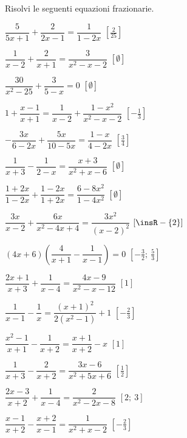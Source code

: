\begin{esercizio}[\Ast]
\label{ese:20.21}
Risolvi le seguenti equazioni frazionarie.
\begin{multicols}{2}
\begin{enumeratea}
 \item $\dfrac{5}{5x+1}+\dfrac{2}{2x-1}=\dfrac{1}{1-2x}$
  \hfill $\left[\frac{2}{25}\right]$
 \item $\dfrac{1}{x-2}+\dfrac{2}{x+1}=\dfrac{3}{x^{2}-x-2}$
  \hfill $\left[\emptyset\right]$
 \item $\dfrac{30}{x^{2}-25}+\dfrac{3}{5-x}=0$
  \hfill $\left[\emptyset\right]$
 \item $1+\dfrac{x-1}{x+1}=\dfrac{1}{x-2}+\dfrac{1-x^{2}}{x^{2}-x-2}$
  \hfill $\left[-{\frac{1}{3}}\right]$
 \item $-{\dfrac{3x}{6-2x}}+\dfrac{5x}{10-5x}=\dfrac{1-x}{4-2x}$
  \hfill $\left[\frac{3}{4}\right]$
 \item $\dfrac{1}{x+3}-\dfrac{1}{2-x}=\dfrac{x+3}{x^{2}+x-6}$
  \hfill $\left[\emptyset\right]$
 \item $\dfrac{1+2x}{1-2x}+\dfrac{1-2x}{1+2x}=\dfrac{6-8x^{2}}{1-4x^{2}}$
  \hfill $\left[\emptyset\right]$
 \item $\dfrac{3x}{x-2}+\dfrac{6x}{x^{2}-4x+4}=\dfrac{3x^{2}}{(x-2)^{2}}$
  \hfill $\left[\insR-\{2\}\right]$
 \item $(4x+6)\left(\dfrac{4}{x+1}-\dfrac{1}{x-1}\right)=0$
  \hfill $\left[-{\frac{3}{2}};~\frac{5}{3}\right]$
 \item $\dfrac{2x+1}{x+3}+\dfrac{1}{x-4}=\dfrac{4x-9}{x^{2}-x-12}$
  \hfill $\left[1\right]$
 \item $\dfrac{1}{x-1}-\dfrac{1}{x}=\dfrac{(x+1)^{2}}{2(x^{2}-1)}+1$
  \hfill $\left[-{\frac{2}{3}}\right]$
 \item $\dfrac{x^{2}-1}{x+1}-\dfrac{1}{x+2}=\dfrac{x+1}{x+2}-x$
  \hfill $\left[1\right]$
 \item $\dfrac{1}{x+3}-\dfrac{2}{x+2}=\dfrac{3x-6}{x^{2}+5x+6}$
  \hfill $\left[\frac{1}{2}\right]$
 \item $\dfrac{2x-3}{x+2}+\dfrac{1}{x-4}=\dfrac{2}{x^{2}-2x-8}$
  \hfill $\left[2;~3\right]$
 \item $\dfrac{x-1}{x+2}-\dfrac{x+2}{x-1}=\dfrac{1}{x^{2}+x-2}$
  \hfill $\left[-\frac{2}{3}\right]$
\end{enumeratea}
\end{multicols}
\end{esercizio}

